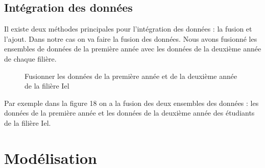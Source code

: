 \documentclass{article}
\begin{document}
            \subsection{Intégration des données}
            Il existe deux méthodes principales pour l’intégration des données : la fusion et l’ajout. Dans notre cas on va faire la fusion des données. Nous avons fusionné les ensembles de données de la première année avec les données de la deuxième année de chaque filière.
            \begin{figure}[h!]
                \centering
                \caption{Fusionner les données de la première année et de la deuxième année de la filière Iel}
                \label{fig:18}
            \end{figure}    
            \newpage Par exemple dans la figure 18 on a la fusion des deux ensembles des données : les données de la première année et les données de la deuxième année des étudiants de la filière Iel.
            \newpage \section{Modélisation}
\end{document}
